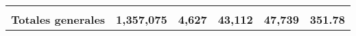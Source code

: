 \begin{tabular}{lrcclr}
	& \multicolumn{1}{l}{}                                           & \multicolumn{1}{l}{}                                       & \multicolumn{1}{l}{} &                                                                     & \multicolumn{1}{l}{}                                                         \\
	\rowcolor[HTML]{DDEBF7} 
	\textbf{Totales generales}                                     & \textbf{1,357,075}                                             & \multicolumn{1}{r}{\cellcolor[HTML]{DDEBF7}\textbf{4,627}} & \textbf{43,112}      & \textbf{47,739}                                                     & \textbf{351.78}                                                             
\end{tabular}